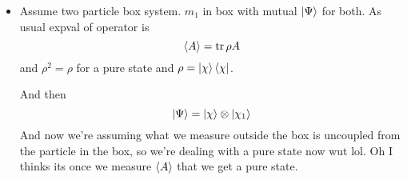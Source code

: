 \documentclass[11pt, a4paper]{article}
\begin{document}
\begin{itemize}
    \item Assume two particle box system. $ m_{1} $ in box with mutual $ \ket{\Psi} $ for both. As usual expval of operator is
    \begin{equation*}
        \ev{A} = \tr \rho A 
    \end{equation*}
    and $ \rho^{2} = \rho $ for a pure state and $ \rho = \ket{\chi}\bra{\chi} $. 

    And then
    \begin{equation*}
        \ket{\Psi} = \ket{\chi} \otimes \ket{\chi_{1}}
    \end{equation*}
    And now we're assuming what we measure outside the box is uncoupled from the particle in the box, so we're dealing with a pure state now wut lol. Oh I thinks its once we measure $ \ev{A} $ that we get a pure state.
    
\end{itemize}
\end{document}
